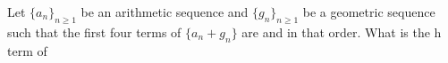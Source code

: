 Let $\{a_n\}_{n\geq 1}$ be an arithmetic sequence and $\{g_n\}_{n\geq 1}$ be a geometric sequence such that the first four terms of $\{a_n+g_n\}$ are    and  in that order.  What is the h term of 